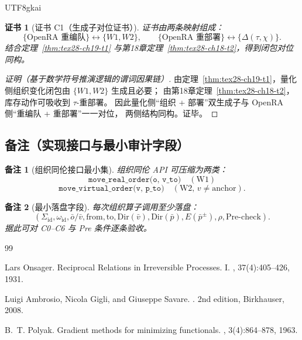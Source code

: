 \documentclass[12pt]{article}
\newtheorem{remark}{备注}[section]
\newtheorem{Certificate}{证书}[section]
\begin{document}
\begin{CJK*}{UTF8}{gkai}
\begin{Certificate}[证书 C1（生成子对位证书）]
\label{cert:tex28-ch19-c1}
证书由两条映射组成：
\[
  \{\text{OpenRA 重编队}\}\leftrightarrow\{W1,W2\},
  \qquad
  \{\text{OpenRA 重部署}\}\leftrightarrow\{\Delta(\tau,\chi)\}.
\]
结合定理~\ref{thm:tex28-ch19-t1} 与第18章定理~\ref{thm:tex28-ch18-t2}，得到闭包对位同构。
\end{Certificate}

\begin{proof}[证明（基于数学符号推演逻辑的谓词因果链）]
由定理~\ref{thm:tex28-ch19-t1}，量化侧组织变化闭包由 $\{W1,W2\}$ 生成且必要；
由第18章定理~\ref{thm:tex28-ch18-t2}，库存动作可吸收到 $\tau$-重部署。
因此量化侧“组织 + 部署”双生成子与 OpenRA 侧“重编队 + 重部署”一一对位，
两侧结构同构。证毕。
\end{proof}

\subsection{备注（实现接口与最小审计字段）}
\label{subsec:tex28-ch19-remarks}

\begin{remark}[组织同伦接口最小集]
组织同伦 API 可压缩为两类：
\[
  \texttt{move\_real\_order(o, v\_to)}\quad(\text{W1})
\]
\[
  \texttt{move\_virtual\_order(v, p\_to)}\quad(\text{W2,\ }v\neq\text{anchor})
  .
\]
\end{remark}

\begin{remark}[最小落盘字段]
每次组织算子调用至少落盘：
\[
  (\Sigma_{\mathrm{id}},\omega_{\mathrm{id}},\bar o/\bar v,\mathrm{from},\mathrm{to},
  \mathrm{Dir}(\bar v),\mathrm{Dir}(\bar p),E(\bar p^\pm),\rho,\mathrm{Pre\text{-}check}).
\]
据此可对 C0--C6 与 Pre 条件逐条验收。
\end{remark}

\clearpage
\begin{thebibliography}{99}

Lars Onsager.
\newblock Reciprocal Relations in Irreversible Processes. I.
, 37(4):405--426, 1931.

Luigi Ambrosio, Nicola Gigli, and Giuseppe Savare.
.
\newblock 2nd edition, Birkhauser, 2008.

B.~T. Polyak.
\newblock Gradient methods for minimizing functionals.
, 3(4):864--878, 1963.


\end{thebibliography}
\end{CJK*}
\end{document}
